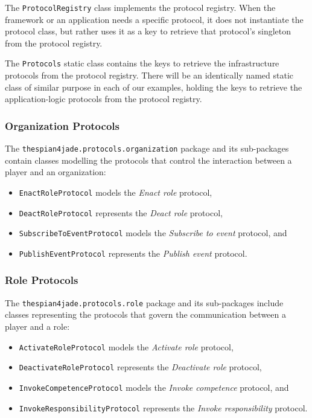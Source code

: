 The \texttt{ProtocolRegistry} class implements the protocol registry.
When the framework or an application needs a specific protocol, it does not instantiate the protocol class, but rather uses it as a key to retrieve that protocol's singleton from the protocol registry. 

The \texttt{Protocols} static class contains the keys to retrieve the infrastructure protocols from the protocol registry.
There will be an identically named static class of similar purpose in each of our examples, holding the keys to retrieve the application-logic protocols from the protocol registry. 

\subsubsection{Organization Protocols}

The \texttt{thespian4jade.protocols.organization} package and its sub-packages contain classes modelling the protocols that control the interaction between a player and an organization:
\begin{itemize}
	\item \texttt{EnactRoleProtocol} models the \textit{Enact role} protocol,
	\item \texttt{DeactRoleProtocol} represents the \textit{Deact role} protocol,
	\item \texttt{SubscribeToEventProtocol} models the \textit{Subscribe to event} protocol, and
	\item \texttt{PublishEventProtocol} represents the \textit{Publish event} protocol.
\end{itemize}

\subsubsection{Role Protocols}

The \texttt{thespian4jade.protocols.role} package and its sub-packages include classes representing the protocols that govern the communication between a player and a role:
\begin{itemize}
	\item \texttt{ActivateRoleProtocol} models the \textit{Activate role} protocol,
	\item \texttt{DeactivateRoleProtocol} represents the \textit{Deactivate role} protocol,
	\item \texttt{InvokeCompetenceProtocol} models the \textit{Invoke competence} protocol, and
	\item \texttt{InvokeResponsibilityProtocol} represents the \textit{Invoke responsibility} protocol.
\end{itemize}

